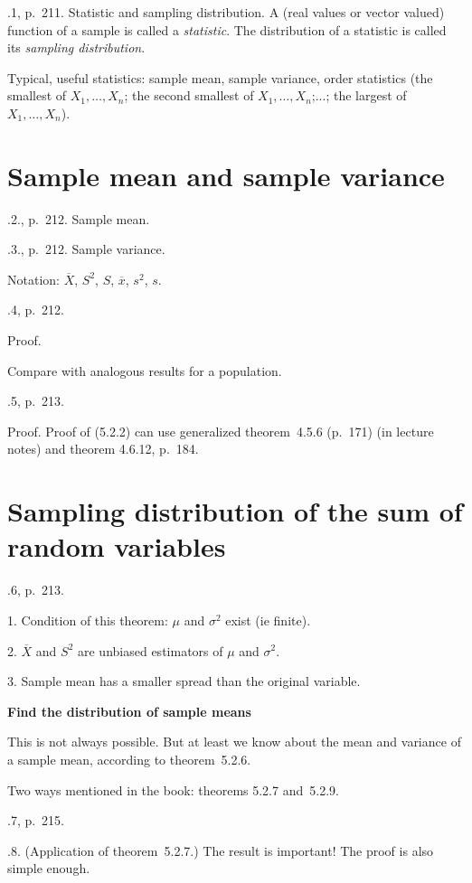 \documentclass[12pt]{article}
\begin{document}
.1, p.~211. Statistic and sampling distribution.
A (real values or vector valued) function of a sample is called a \emph{statistic}.
The distribution of a statistic is called its \emph{sampling
distribution}.

\alert%
Typical, useful statistics: sample mean, sample variance,
order statistics (the smallest of $X_1,\dotsc,X_n$;
the second smallest of $X_1,\dotsc,X_n$;...; the largest
of $X_1,\dotsc,X_n$).

\section{Sample mean and sample variance}

.2., p.~212. Sample mean.

.3., p.~212. Sample variance.

\alert%
Notation: $\overline{X}$, $S^2$, $S$,
$\overline{x}$, $s^2$, $s$.

.4, p.~212.

Proof.

Compare with analogous results for a population.

.5, p.~213.

Proof. Proof of (5.2.2) can use generalized theorem~4.5.6 (p.~171)
(in lecture notes) and theorem 4.6.12, p.~184.

\section{Sampling distribution of the sum of random variables}

.6, p.~213.

\alert%
1. Condition of this theorem: $\mu$ and $\sigma^2$ exist (ie finite).

2. $\overline{X}$ and $S^2$ are unbiased estimators of $\mu$ and
$\sigma^2$.

3. Sample mean has a smaller spread than the original variable.

\textbf{Find the distribution of sample means}

This is not always possible.
But at least we know about the mean and variance of a sample mean,
according to theorem~5.2.6.

Two ways mentioned in the book: theorems 5.2.7 and~5.2.9.

.7, p.~215.

.8.
    (Application of theorem~5.2.7.)
    The result is important!
    The proof is also simple enough.
\end{document}
